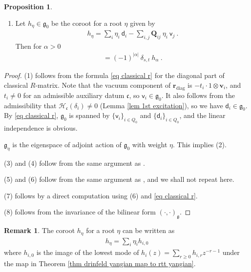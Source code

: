 \documentclass[10pt]{amsart}
\theoremstyle{definition}
\newtheorem{Proposition}[Theorem]{Proposition}
\newtheorem{Remark}[Theorem]{Remark}
\numberwithin{equation}{section}
\newcommand{\bC}{\mathbb{C}}
\newcommand{\bv}{\mathbf{v}}
\newcommand{\cH}{\mathcal{H}}
\newcommand{\diag}{\operatorname{diag}}
\newcommand{\id}{\operatorname{id}}
\begin{document}
\begin{Proposition}
\begin{enumerate}
\begin{align}\label{bilinear form}
\begin{pmatrix}
0 & \id\\
\id & \pmb Q
\end{pmatrix}\quad\text{for}\quad \pmb Q_{ij}=\sum_{a:i\to j}t_a+\sum_{b:j\to i}t_b\in \bC(\mathsf t_0)\:.
\end{align}
\item Let $h_\eta\in \mathfrak{g}_0$ be the coroot for a root $\eta$ given by
\begin{align*}
    h_{\eta}=\sum_{i}\eta_i\:\mathsf d_i-\sum_{i,j}\pmb Q_{ij}\:\eta_i\:\mathsf v_j\:.
\end{align*}
Then for $\alpha>0$
\begin{align*}
    [e_{\alpha}^{(s)},e_{-\alpha}^{(t)}]=(-1)^{|\alpha|}\:\delta_{s,t}\: h_{\alpha}\:.
\end{align*}
\end{enumerate}
\end{Proposition}

\begin{proof}
(1) follows from the formula \eqref{eq classical r} for the diagonal part of classical $R$-matrix. Note that the vacuum component of $\pmb r_{\diag}$ is $-t_i\cdot 1\otimes \bv_i$, and $t_i\neq 0$ for an admissible auxiliary datum $\mathfrak{c}$, so $\mathsf v_i\in \mathfrak{g}_0$. It also follows from the admissibility that $\cH_{\mathfrak{c}}(\delta_i)\neq 0$ (Lemma \ref{lem 1st excitation}), so we have $\mathsf d_i\in \mathfrak{g}_0$. By \eqref{eq classical r}, $\mathfrak{g}_0$ is spanned by $\{\mathsf v_i\}_{i\in Q_0}$ and $\{\mathsf d_i\}_{i\in Q_0}$, and the linear independence is obvious. 

$\mathfrak{g}_\eta$ is the eigenspace of adjoint action of $\mathfrak{g}_0$ with weight $\eta$. This implies (2).

(3) and (4) follow from the same argument as \cite[\S 5.3.7]{MO}. 

(5) and (6) follow from the same argument as \cite[\S 5.3.8]{MO}, and we shall not repeat here.

(7) follows by a direct computation using (6) and \eqref{eq classical r}. 

(8) follows from the invariance of the bilinear form $(\cdot,\cdot)_{\mathfrak{g}}$.
\end{proof}

\begin{Remark}
The coroot $h_\eta$ for a root $\eta$ can be written as
\begin{align*}
h_\eta=\sum_{i}\eta_i h_{i,0}
\end{align*}
where $h_{i,0}$ is the image of the lowest mode of $h_i(z)=\sum_{r\geqslant 0}h_{i,r}z^{-r-1}$ under the map in Theorem \ref{thm drinfeld yangian map to rtt yangian}.
\end{Remark}
\end{document}
